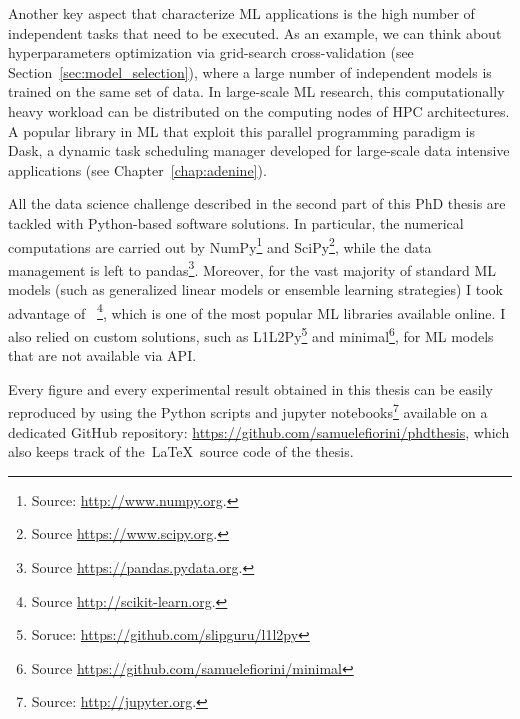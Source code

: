 Another key aspect that characterize ML applications is the high number of independent tasks that need to be executed. As an example, we can think about hyperparameters optimization via grid-search cross-validation (see Section~\ref{sec:model_selection}), where a large number of independent models is trained on the same set of data.
In large-scale ML research, this computationally heavy workload can be distributed on the computing nodes of HPC architectures.
A popular library in ML that exploit this parallel programming paradigm is Dask, a dynamic task scheduling manager developed for large-scale data intensive applications (see Chapter~\ref{chap:adenine}).

All the data science challenge described in the second part of this PhD thesis are tackled with Python-based software solutions. In particular, the numerical computations are carried out by {\sc NumPy}\footnote{ Source: \url{http://www.numpy.org}.} and {\sc SciPy}\footnote{ Source \url{https://www.scipy.org}.}, while the data management is left to {\sc pandas}\footnote{ Source \url{https://pandas.pydata.org}.}. Moreover, for the vast majority of standard ML models (such as generalized linear models or ensemble learning strategies) I took advantage of \sklearn~\cite{scikit-learn}\footnote{ Source \url{http://scikit-learn.org}.}, which is one of the most popular ML libraries available online.
I also relied on custom solutions, such as {\sc L1L2Py}\footnote{ Soruce: \url{https://github.com/slipguru/l1l2py}} and {\sc minimal}\footnote{ Source \url{https://github.com/samuelefiorini/minimal}}, for ML models that are not available via \sklearn API.

Every figure and every experimental result obtained in this thesis can be easily reproduced by using the Python scripts and {\sc jupyter}  notebooks\footnote{ Source: \url{http://jupyter.org}.} available on a dedicated GitHub repository: \url{https://github.com/samuelefiorini/phdthesis}, which also keeps track of the~\LaTeX~source code of the thesis.